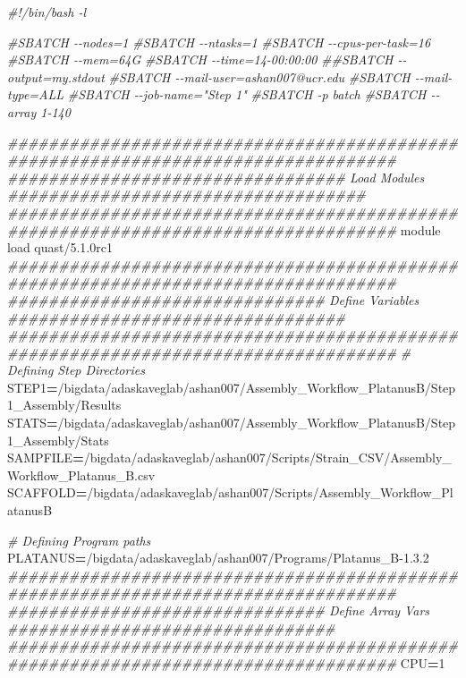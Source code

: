 \documentclass[
]{book}
\newenvironment{Shaded}{\begin{snugshade}}{\end{snugshade}}
\newcommand{\CommentTok}[1]{\textcolor[rgb]{0.56,0.35,0.01}{\textit{#1}}}
\newcommand{\ExtensionTok}[1]{#1}
\newcommand{\NormalTok}[1]{#1}
\newcommand{\OperatorTok}[1]{\textcolor[rgb]{0.81,0.36,0.00}{\textbf{#1}}}
\newcommand{\VariableTok}[1]{\textcolor[rgb]{0.00,0.00,0.00}{#1}}
\begin{document}
\begin{Shaded}
\begin{Highlighting}[]
\CommentTok{\#!/bin/bash {-}l}

\CommentTok{\#SBATCH {-}{-}nodes=1}
\CommentTok{\#SBATCH {-}{-}ntasks=1}
\CommentTok{\#SBATCH {-}{-}cpus{-}per{-}task=16}
\CommentTok{\#SBATCH {-}{-}mem=64G}
\CommentTok{\#SBATCH {-}{-}time=14{-}00:00:00}
\CommentTok{\#\#SBATCH {-}{-}output=my.stdout}
\CommentTok{\#SBATCH {-}{-}mail{-}user=ashan007@ucr.edu}
\CommentTok{\#SBATCH {-}{-}mail{-}type=ALL}
\CommentTok{\#SBATCH {-}{-}job{-}name="Step 1"}
\CommentTok{\#SBATCH {-}p batch}
\CommentTok{\#SBATCH {-}{-}array 1{-}140}

\CommentTok{\#\#\#\#\#\#\#\#\#\#\#\#\#\#\#\#\#\#\#\#\#\#\#\#\#\#\#\#\#\#\#\#\#\#\#\#\#\#\#\#\#\#\#\#\#\#\#\#\#\#\#\#\#\#\#\#\#\#\#\#\#\#\#\#\#\#\#\#\#\#\#\#\#\#\#\#\#\#\#\#\#\#}
\CommentTok{\#\#\#\#\#\#\#\#\#\#\#\#\#\#\#\#\#\#\#\#\#\#\#\#\#\#\#\#\#\#\#\#\# Load Modules \#\#\#\#\#\#\#\#\#\#\#\#\#\#\#\#\#\#\#\#\#\#\#\#\#\#\#\#\#\#\#\#\#\#\#}
\CommentTok{\#\#\#\#\#\#\#\#\#\#\#\#\#\#\#\#\#\#\#\#\#\#\#\#\#\#\#\#\#\#\#\#\#\#\#\#\#\#\#\#\#\#\#\#\#\#\#\#\#\#\#\#\#\#\#\#\#\#\#\#\#\#\#\#\#\#\#\#\#\#\#\#\#\#\#\#\#\#\#\#\#\#}
\ExtensionTok{module}\NormalTok{ load quast/5.1.0rc1}
\CommentTok{\#\#\#\#\#\#\#\#\#\#\#\#\#\#\#\#\#\#\#\#\#\#\#\#\#\#\#\#\#\#\#\#\#\#\#\#\#\#\#\#\#\#\#\#\#\#\#\#\#\#\#\#\#\#\#\#\#\#\#\#\#\#\#\#\#\#\#\#\#\#\#\#\#\#\#\#\#\#\#\#\#\#}
\CommentTok{\#\#\#\#\#\#\#\#\#\#\#\#\#\#\#\#\#\#\#\#\#\#\#\#\#\#\#\#\#\#\# Define Variables \#\#\#\#\#\#\#\#\#\#\#\#\#\#\#\#\#\#\#\#\#\#\#\#\#\#\#\#\#\#\#\#\#}
\CommentTok{\#\#\#\#\#\#\#\#\#\#\#\#\#\#\#\#\#\#\#\#\#\#\#\#\#\#\#\#\#\#\#\#\#\#\#\#\#\#\#\#\#\#\#\#\#\#\#\#\#\#\#\#\#\#\#\#\#\#\#\#\#\#\#\#\#\#\#\#\#\#\#\#\#\#\#\#\#\#\#\#\#\#}
\CommentTok{\# Defining Step Directories}
\VariableTok{STEP1}\OperatorTok{=}\NormalTok{/bigdata/adaskaveglab/ashan007/Assembly\_Workflow\_PlatanusB/Step1\_Assembly/Results}
\VariableTok{STATS}\OperatorTok{=}\NormalTok{/bigdata/adaskaveglab/ashan007/Assembly\_Workflow\_PlatanusB/Step1\_Assembly/Stats}
\VariableTok{SAMPFILE}\OperatorTok{=}\NormalTok{/bigdata/adaskaveglab/ashan007/Scripts/Strain\_CSV/Assembly\_Workflow\_Platanus\_B.csv }
\VariableTok{SCAFFOLD}\OperatorTok{=}\NormalTok{/bigdata/adaskaveglab/ashan007/Scripts/Assembly\_Workflow\_PlatanusB}

\CommentTok{\# Defining Program paths}
\VariableTok{PLATANUS}\OperatorTok{=}\NormalTok{/bigdata/adaskaveglab/ashan007/Programs/Platanus\_B{-}1.3.2}
\CommentTok{\#\#\#\#\#\#\#\#\#\#\#\#\#\#\#\#\#\#\#\#\#\#\#\#\#\#\#\#\#\#\#\#\#\#\#\#\#\#\#\#\#\#\#\#\#\#\#\#\#\#\#\#\#\#\#\#\#\#\#\#\#\#\#\#\#\#\#\#\#\#\#\#\#\#\#\#\#\#\#\#\#\#}
\CommentTok{\#\#\#\#\#\#\#\#\#\#\#\#\#\#\#\#\#\#\#\#\#\#\#\#\#\#\#\#\#\#\# Define Array Vars \#\#\#\#\#\#\#\#\#\#\#\#\#\#\#\#\#\#\#\#\#\#\#\#\#\#\#\#\#\#\#\#}
\CommentTok{\#\#\#\#\#\#\#\#\#\#\#\#\#\#\#\#\#\#\#\#\#\#\#\#\#\#\#\#\#\#\#\#\#\#\#\#\#\#\#\#\#\#\#\#\#\#\#\#\#\#\#\#\#\#\#\#\#\#\#\#\#\#\#\#\#\#\#\#\#\#\#\#\#\#\#\#\#\#\#\#\#\#}
\VariableTok{CPU}\OperatorTok{=}\NormalTok{1}


\end{Highlighting}
\end{Shaded}
\end{document}
